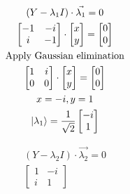 \documentclass[]{article}
\begin{document}
\begin{enumerate}
\begin{enumerate}
          \noindent\begin{minipage}{.49\linewidth}
            \begin{gather*}
              (Y - \lambda_1 I) \cdot \vec{\lambda_1} = 0\\
              \begin{bmatrix}
                -1 & -i\\
                i & -1
              \end{bmatrix}
              \cdot 
              \begin{bmatrix}
                x\\ y
              \end{bmatrix}
              = \begin{bmatrix}
                0\\0
              \end{bmatrix}\\
              \text{Apply Gaussian elimination}\\
              \begin{bmatrix}
                1 & i\\
                0 & 0
              \end{bmatrix}
              \cdot 
              \begin{bmatrix}
                x\\ y
              \end{bmatrix}
              = \begin{bmatrix}
                0\\0
              \end{bmatrix}\\
              x = -i, y = 1\\
              \ket{\lambda_1} = \frac{1}{\sqrt{2}} \begin{bmatrix}
                -i\\1
              \end{bmatrix}
            \end{gather*}
          \end{minipage}
          \begin{minipage}{.45\linewidth}
            \begin{gather*}
              (Y - \lambda_2 I) \cdot \vec{\lambda_2} = 0\\
              \begin{bmatrix}
                1 & -i\\
                i & 1
              \end{bmatrix}

\end{gather*}
\end{minipage}
\end{enumerate}
\end{enumerate}
\end{document}
